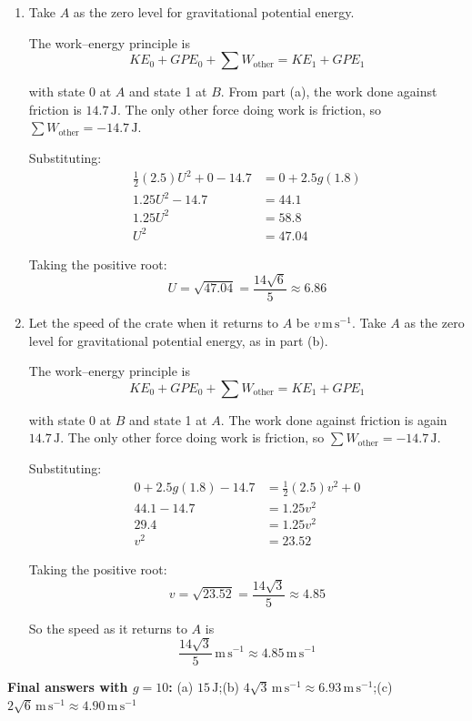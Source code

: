 \documentclass[leqno]{article}
\begin{document}
\begin{enumerate}[
  label=\textbf{\arabic*.},
  leftmargin=*,
  topsep=0pt,
  partopsep=0pt,
  parsep=0pt
]
\begin{djsSolution}
\begin{enumerate}[label=\textbf{(\alph*)}]
  \item Take \(A\) as the zero level for gravitational potential energy.

  The work--energy principle is
  \[
  KE_0+GPE_0+\sum W_{\text{other}}=KE_1+GPE_1
  \]

  with state 0 at \(A\) and state 1 at \(B\). From part (a), the work done against friction is \(14.7\,\mathrm{J}\). The only other force doing work is friction, so \(\sum W_{\text{other}}=-14.7\,\mathrm{J}\).

  Substituting:
  \begin{align*}
  \frac12(2.5)U^2+0-14.7&=0+2.5g(1.8) \\
  1.25U^2-14.7&=44.1 \\
  1.25U^2&=58.8 \\
  U^2&=47.04
  \end{align*}

  Taking the positive root:
  \[
  U=\sqrt{47.04}=\frac{14\sqrt6}{5}\approx 6.86
  \]

  \item Let the speed of the crate when it returns to \(A\) be \(v\,\mathrm{m\,s}^{-1}\). Take \(A\) as the zero level for gravitational potential energy, as in part (b).

  The work--energy principle is
  \[
  KE_0+GPE_0+\sum W_{\text{other}}=KE_1+GPE_1
  \]

  with state 0 at \(B\) and state 1 at \(A\). The work done against friction is again \(14.7\,\mathrm{J}\). The only other force doing work is friction, so \(\sum W_{\text{other}}=-14.7\,\mathrm{J}\).

  Substituting:
  \begin{align*}
  0+2.5g(1.8)-14.7&=\frac12(2.5)v^2+0 \\
  44.1-14.7&=1.25v^2 \\
  29.4&=1.25v^2 \\
  v^2&=23.52
  \end{align*}

  Taking the positive root:
  \[
  v=\sqrt{23.52}=\frac{14\sqrt3}{5}\approx 4.85
  \]

  So the speed as it returns to \(A\) is
  \[
  \frac{14\sqrt3}{5}\,\mathrm{m\,s}^{-1}\approx 4.85\,\mathrm{m\,s}^{-1}
  \]
\end{enumerate}
\par\medskip\noindent\textbf{Final answers with \(g = 10\):} (a) \(15\,\mathrm{J}\);\quad (b) \(4\sqrt{3}\,\mathrm{m\,s^{-1}}\approx 6.93\,\mathrm{m\,s^{-1}}\);\quad (c) \(2\sqrt{6}\,\mathrm{m\,s^{-1}}\approx 4.90\,\mathrm{m\,s^{-1}}\)
\end{djsSolution}



\end{enumerate}
\end{document}
